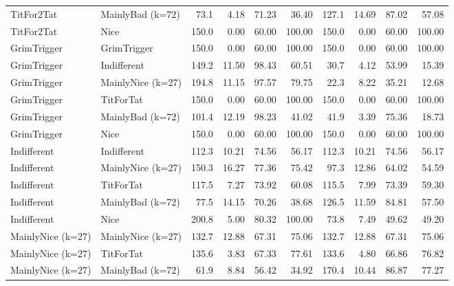 \documentclass[journal,10pt,twoside]{IEEEtran}
\begin{document}
\begin{table}[ht]
\begin{tabular}{ll|rrrr|rrrr}
        TitFor2Tat        & MainlyBad (k=72)  &  73.1 &  4.18 &  71.23 &      36.40 & 127.1 & 14.69 &  87.02 &      57.08 \\
        TitFor2Tat        & Nice              & 150.0 &  0.00 &  60.00 &     100.00 & 150.0 &  0.00 &  60.00 &     100.00 \\
        GrimTrigger       & GrimTrigger       & 150.0 &  0.00 &  60.00 &     100.00 & 150.0 &  0.00 &  60.00 &     100.00 \\
        GrimTrigger       & Indifferent       & 149.2 & 11.50 &  98.43 &      60.51 &  30.7 &  4.12 &  53.99 &      15.39 \\
        GrimTrigger       & MainlyNice (k=27) & 194.8 & 11.15 &  97.57 &      79.75 &  22.3 &  8.22 &  35.21 &      12.68 \\
        GrimTrigger       & TitForTat         & 150.0 &  0.00 &  60.00 &     100.00 & 150.0 &  0.00 &  60.00 &     100.00 \\
        GrimTrigger       & MainlyBad (k=72)  & 101.4 & 12.19 &  98.23 &      41.02 &  41.9 &  3.39 &  75.36 &      18.73 \\
        GrimTrigger       & Nice              & 150.0 &  0.00 &  60.00 &     100.00 & 150.0 &  0.00 &  60.00 &     100.00 \\
        Indifferent       & Indifferent       & 112.3 & 10.21 &  74.56 &      56.17 & 112.3 & 10.21 &  74.56 &      56.17 \\
        Indifferent       & MainlyNice (k=27) & 150.3 & 16.27 &  77.36 &      75.42 &  97.3 & 12.86 &  64.02 &      54.59 \\
        Indifferent       & TitForTat         & 117.5 &  7.27 &  73.92 &      60.08 & 115.5 &  7.99 &  73.39 &      59.30 \\
        Indifferent       & MainlyBad (k=72)  &  77.5 & 14.15 &  70.26 &      38.68 & 126.5 & 11.59 &  84.81 &      57.50 \\
        Indifferent       & Nice              & 200.8 &  5.00 &  80.32 &     100.00 &  73.8 &  7.49 &  49.62 &      49.20 \\
        MainlyNice (k=27) & MainlyNice (k=27) & 132.7 & 12.88 &  67.31 &      75.06 & 132.7 & 12.88 &  67.31 &      75.06 \\
        MainlyNice (k=27) & TitForTat         & 135.6 &  3.83 &  67.33 &      77.61 & 133.6 &  4.80 &  66.86 &      76.82 \\
        MainlyNice (k=27) & MainlyBad (k=72)  &  61.9 &  8.84 &  56.42 &      34.92 & 170.4 & 10.44 &  86.87 &      77.27 \\

\end{tabular}
\end{table}
\end{document}

